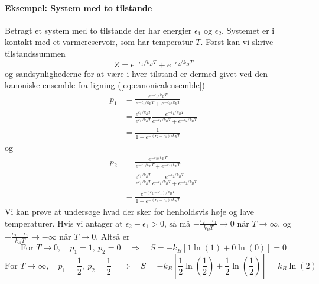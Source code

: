 \paragraph{Eksempel: System med to tilstande}
Betragt et system med to tilstande der har energier $\epsilon_1$ og $\epsilon_2$. Systemet er i kontakt med et varmereservoir, som har temperatur $T$. Først kan vi skrive tilstandssummen
\[ Z=e^{-\epsilon_1/k_BT}+e^{-\epsilon_2/k_BT} \]
og sandsynlighederne for at være i hver tilstand er dermed givet ved den kanoniske ensemble fra ligning (\ref{eq:canonicalensemble})
\begin{align*}
	p_1&=\frac{e^{-\epsilon_1/k_BT}}{e^{-\epsilon_1/k_BT}+e^{-\epsilon_2/k_BT}}\\
	&=\frac{e^{\epsilon_1/k_BT}}{e^{\epsilon_1/k_BT}}\frac{e^{-\epsilon_1/k_BT}}{e^{-\epsilon_1/k_BT}+e^{-\epsilon_2/k_BT}}\\
	&=\frac{1}{1+e^{-(\epsilon_2-\epsilon_1)/k_BT}}
\end{align*}
og
\begin{align*}
	p_2&=\frac{e^{-\epsilon_2/k_BT}}{e^{-\epsilon_1/k_BT}+e^{-\epsilon_2/k_BT}}\\
	&=\frac{e^{\epsilon_1/k_BT}}{e^{\epsilon_1/k_BT}}\frac{e^{-\epsilon_2/k_BT}}{e^{-\epsilon_1/k_BT}+e^{-\epsilon_2/k_BT}}\\
	&=\frac{e^{-(\epsilon_2-\epsilon_1)/k_BT}}{1+e^{-(\epsilon_2-\epsilon_1)/k_BT}}
\end{align*}
Vi kan prøve at undersøge hvad der sker for henholdsvis høje og lave temperaturer. Hvis vi antager at $\epsilon_2-\epsilon_1>0$, så må $-\frac{\epsilon_2-\epsilon_1}{k_BT}\to 0$ når $T\to\infty$, og $-\frac{\epsilon_2-\epsilon_1}{k_BT}\to -\infty$ når $T\to 0$. Altså er
\[\text{For } T\to 0,\quad p_1=1,\: p_2=0\quad\Rightarrow\quad S=-k_B\left[1\ln(1)+ 0\ln (0)\right]=0 \]
\[\text{For } T\to \infty,\quad p_1=\frac{1}{2},\: p_2=\frac{1}{2}\quad\Rightarrow\quad S=-k_B\left[\frac{1}{2}\ln\left(\frac{1}{2}\right)+ \frac{1}{2}\ln\left(\frac{1}{2}\right)\right]=k_B\ln(2) \]

